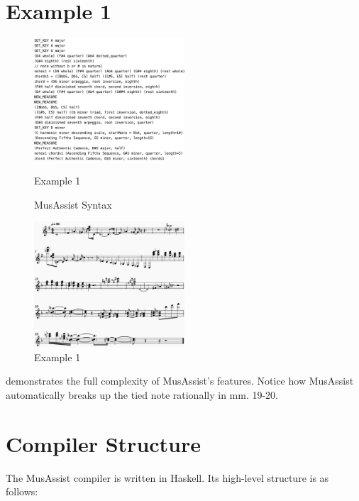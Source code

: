 \documentclass{article}
\begin{document}
\section{Example 1}
\begin{figure}[h!]
\centering
\includegraphics[width=0.5\textwidth]{images/example_program_code}
\caption{Example 1}
\label{fig:example_program}
\caption{MusAssist Syntax}
\end{figure}

\begin{figure}[h!]
\centering
\includegraphics[width=0.5\textwidth]{images/example_program}
\caption{Example 1}
\label{fig:ex1}
\end{figure}

\newpage
  
 demonstrates the full complexity of MusAssist's features. Notice how MusAssist automatically breaks up the tied note rationally in mm. 19-20.



\section{Compiler Structure}

The MusAssist compiler is written in Haskell. Its high-level structure is as follows: 
\end{document}
